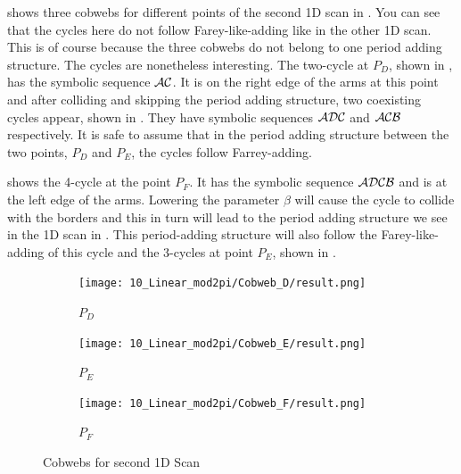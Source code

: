  shows three cobwebs for different points of the second 1D scan in .
You can see that the cycles here do not follow Farey-like-adding like in the other 1D scan.
This is of course because the three cobwebs do not belong to one period adding structure.
The cycles are nonetheless interesting.
The two-cycle at $P_D$, shown in , has the symbolic sequence $\mathcal{A}\mathcal{C}$.
It is on the right edge of the arms at this point and after colliding and skipping the period adding structure, two coexisting cycles appear, shown in .
They have symbolic sequences $\mathcal{A}\mathcal{D}\mathcal{C}$ and $\mathcal{A}\mathcal{C}\mathcal{B}$ respectively.
It is safe to assume that in the period adding structure between the two points, $P_D$ and $P_E$, the cycles follow Farrey-adding.

 shows the 4-cycle at the point $P_F$.
It has the symbolic sequence $\mathcal{A}\mathcal{D}\mathcal{C}\mathcal{B}$ and is at the left edge of the arms.
Lowering the parameter $\beta$ will cause the cycle to collide with the borders and this in turn will lead to the period adding structure we see in the 1D scan in .
This period-adding structure will also follow the Farey-like-adding of this cycle and the 3-cycles at point $P_E$, shown in .

\begin{figure}
	\centering
	\begin{subfigure}{0.3\textwidth}
		\centering
		\texttt{[image: 10\_Linear\_mod2pi/Cobweb\_D/result.png]}
		\caption{$P_D$}
		\label{fig:pcw.lin.CobwebD}
	\end{subfigure}
	\begin{subfigure}{0.3\textwidth}
		\centering
		\texttt{[image: 10\_Linear\_mod2pi/Cobweb\_E/result.png]}
		\caption{$P_E$}
		\label{fig:pcw.lin.CobwebE}
	\end{subfigure}
	\begin{subfigure}{0.3\textwidth}
		\centering
		\texttt{[image: 10\_Linear\_mod2pi/Cobweb\_F/result.png]}
		\caption{$P_F$}
		\label{fig:pcw.lin.CobwebF}
	\end{subfigure}
	\caption{Cobwebs for second 1D Scan}
	\label{fig:pcw.lin.CobwebD-F}
\end{figure}

